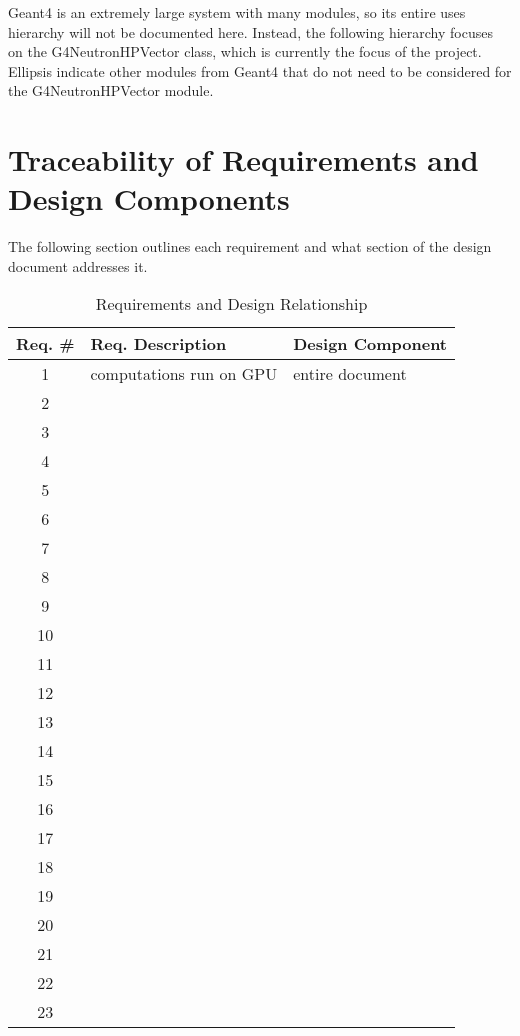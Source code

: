 \documentclass[12pt]{article}
\begin{document}
Geant4 is an extremely large system with many modules, so its entire uses hierarchy will not be documented here. Instead, the following hierarchy focuses on the G4NeutronHPVector class, which is currently the focus of the project. Ellipsis indicate other modules from Geant4 that do not need to be considered for the G4NeutronHPVector module.

\section{Traceability of Requirements and Design Components}%
The following section outlines each requirement and what section of the design document addresses it.

\begin{table}[h]
\centering
\caption{Requirements and Design Relationship}\label{Table_RequirementsAndDesign}
\begin{tabularx}{\textwidth}{cXX}

\toprule
\bf Req. \# & \bf Req. Description & \bf Design Component\\\midrule
1  & computations run on GPU & entire document\\\hline
2  &  & \\\hline
3  &  & \\\hline
4  &  & \\\hline
5  &  & \\\hline
6  &  & \\\hline
7  &  & \\\hline
8  &  & \\\hline
9  &  & \\\hline
10 &  & \\\hline
11 &  & \\\hline
12 &  & \\\hline
13 &  & \\\hline
14 &  & \\\hline
15 &  & \\\hline
16 &  & \\\hline
17 &  & \\\hline
18 &  & \\\hline
19 &  & \\\hline
20 &  & \\\hline
21 &  & \\\hline
22 &  & \\\hline
23 &  & \\
\bottomrule
\end{tabularx}
\end{table}
\end{document}
